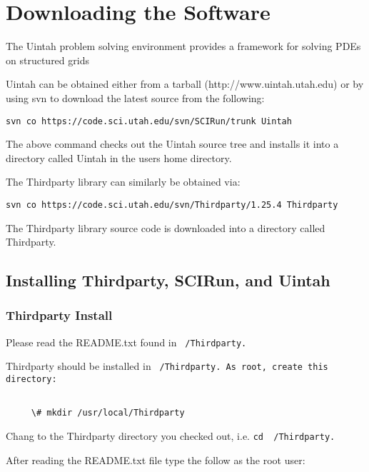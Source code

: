 \section{Downloading the Software} \label{Sec:download}

The Uintah problem solving environment provides a framework for solving PDEs on structured grids

Uintah can be obtained either from a tarball (http://www.uintah.utah.edu) or by using svn to download the latest source from the following:

\begin{Verbatim}[fontsize=\footnotesize]
svn co https://code.sci.utah.edu/svn/SCIRun/trunk Uintah
\end{Verbatim}

The above command checks out the Uintah source tree and installs it
into a directory called Uintah in the users home directory.

The Thirdparty library can similarly be obtained via:
\begin{Verbatim}[fontsize=\footnotesize]
svn co https://code.sci.utah.edu/svn/Thirdparty/1.25.4 Thirdparty
\end{Verbatim}

The Thirdparty library source code is downloaded into a directory
called Thirdparty.

\subsection{Installing Thirdparty, SCIRun, and Uintah}

\subsubsection{Thirdparty Install}


Please read the README.txt found in \tt~/Thirdparty.\normalfont

Thirdparty should be installed in \tt~/Thirdparty.\normalfont
As root, create this directory:

\begin{Verbatim}[fontsize=\footnotesize]

     \# mkdir /usr/local/Thirdparty

\end{Verbatim}

Chang to the Thirdparty directory you checked out, i.e. \tt cd ~/Thirdparty.\normalfont

After reading the README.txt file type the follow as the root user:

